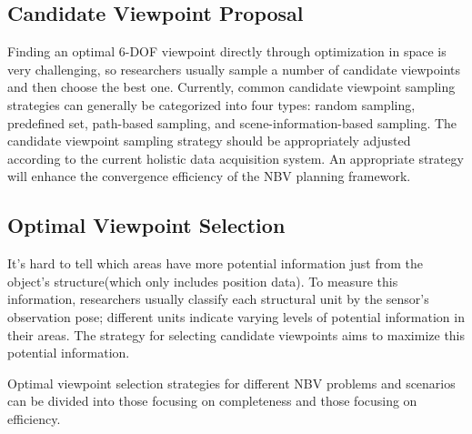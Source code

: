 \subsection{Candidate Viewpoint Proposal}
Finding an optimal 6-DOF viewpoint directly through optimization in space is very challenging, so researchers usually sample a number of candidate viewpoints and then choose the best one.
Currently, common candidate viewpoint sampling strategies can generally be categorized into four types: random sampling\cite{pan2021global,potthast2014probabilistic}, predefined set\cite{connolly1985determination,mendoza2020supervised,pan2022scvp}, path-based sampling\cite{zhou2021fuel,vasquez2018tree,deng2020frontier,batinovic2022shadowcasting}, and scene-information-based sampling\cite{border2024surface,batinovic2021multi}.
The candidate viewpoint sampling strategy should be appropriately adjusted according to the current holistic data acquisition system.
An appropriate strategy will enhance the convergence efficiency of the NBV planning framework.

\subsection{Optimal Viewpoint Selection}
It's hard to tell which areas have more potential information just from the object's structure(which only includes position data).
To measure this information, researchers usually classify each structural unit by the sensor's observation pose; different units indicate varying levels of potential information in their areas.
The strategy for selecting candidate viewpoints aims to maximize this potential information.

Optimal viewpoint selection strategies for different NBV problems and scenarios can be divided into those focusing on completeness and those focusing on efficiency.

